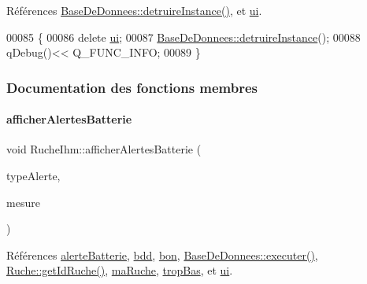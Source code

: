Références \hyperlink{class_base_de_donnees_a457401c0816b888c77ce915997545f4e}{Base\+De\+Donnees\+::detruire\+Instance()}, et \hyperlink{class_ruche_ihm_a64786058bd7f88ca2f1e9743bb27c25b}{ui}.


\begin{DoxyCode}
00085 \{
00086     \textcolor{keyword}{delete} \hyperlink{class_ruche_ihm_a64786058bd7f88ca2f1e9743bb27c25b}{ui};
00087     \hyperlink{class_base_de_donnees_a457401c0816b888c77ce915997545f4e}{BaseDeDonnees::detruireInstance}();
00088     qDebug()<< Q\_FUNC\_INFO;
00089 \}
\end{DoxyCode}


\subsubsection{Documentation des fonctions membres}
\mbox{\label{class_ruche_ihm_a5181062e21dc73908b660d97e9621fb6}} 
\paragraph{\texorpdfstring{afficher\+Alertes\+Batterie}{afficherAlertesBatterie}}
{\footnotesize\ttfamily void Ruche\+Ihm\+::afficher\+Alertes\+Batterie (\begin{DoxyParamCaption}\item[{\hyperlink{parametres_8h_aaa6de8207c94675264c90b10b613368d}{Seuils\+Alertes}}]{type\+Alerte,  }\item[{double}]{mesure }\end{DoxyParamCaption})\hspace{0.3cm}{\ttfamily [slot]}}



Références \hyperlink{parametres_8h_a83a725fd153179a2bd97afcc8307737ba11c71364df2afd149875ebfe0238ef7e}{alerte\+Batterie}, \hyperlink{class_ruche_ihm_a0851936fe212e8d40538264f09749153}{bdd}, \hyperlink{parametres_8h_aaa6de8207c94675264c90b10b613368da5ac8ec3b54d90a07c6bb5a77ef971821}{bon}, \hyperlink{class_base_de_donnees_aa8de5f8f8bb17edc43f5c0ee33712081}{Base\+De\+Donnees\+::executer()}, \hyperlink{class_ruche_a9f2de5ef29557ec7a53d5e22df34d164}{Ruche\+::get\+Id\+Ruche()}, \hyperlink{class_ruche_ihm_a43a6b1fa31f4fba58d919daae3707b38}{ma\+Ruche}, \hyperlink{parametres_8h_aaa6de8207c94675264c90b10b613368da4257e2f8921856770c8266f55c937295}{trop\+Bas}, et \hyperlink{class_ruche_ihm_a64786058bd7f88ca2f1e9743bb27c25b}{ui}.




